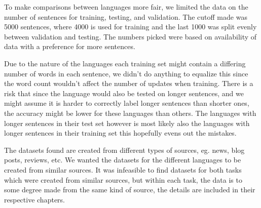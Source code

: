 To make comparisons between languages more fair, we limited the data on the
number of sentences for training, testing, and validation. The cutoff made was
5000 sentences, where 4000 is used for training and the last 1000 was split
evenly between validation and testing. The numbers picked were based on
availability of data with a preference for more sentences. 

Due to the nature of the languages each training set might contain a differing
number of words in each sentence, we didn't do anything to equalize this since
the word count wouldn't affect the number of updates when training. There is a
risk that since the language would also be tested on longer sentences, and we
might assume it is harder to correctly label longer sentences than shorter ones,
the accuracy might be lower for these languages than others. The languages with
longer sentences in their test set however is most likely also the languages
with longer sentences in their training set this hopefully evens out the
mistakes.

The datasets found are created from different types of sources, eg. news, blog
posts, reviews, etc. We wanted the datasets for the different languages to be
created from similar sources. It was infeasible to find datasets for both tasks
which were created from similar sources, but within each task, the data is to
some degree made from the same kind of source, the details are included in their
respective chapters.


\pagebreak
